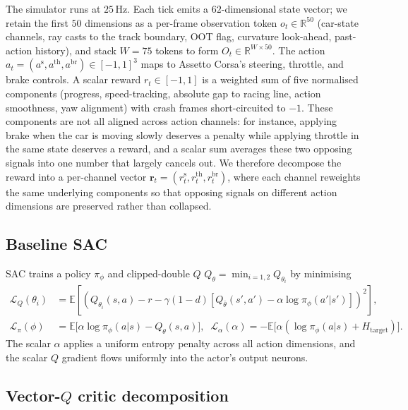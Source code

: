 \documentclass{article}
\begin{document}
The simulator runs at $25$\,Hz. Each tick emits a $62$-dimensional
state vector; we retain the first $50$ dimensions as a per-frame
observation token $o_t \in \mathbb{R}^{50}$ (car-state channels, ray
casts to the track boundary, OOT flag, curvature look-ahead,
past-action history), and stack $W{=}75$ tokens to form
$O_t \in \mathbb{R}^{W\times 50}$. The action
$a_t = (a^\mathrm{s}, a^\mathrm{th}, a^\mathrm{br}) \in [-1, 1]^3$ maps
to Assetto Corsa's steering, throttle, and brake controls. A scalar
reward $r_t \in [-1, 1]$ is a weighted sum of five normalised
components (progress, speed-tracking, absolute gap to racing line,
action smoothness, yaw alignment) with crash frames short-circuited
to $-1$. These components are not all aligned across action
channels: for instance, applying brake when the car is moving
slowly deserves a penalty while applying throttle in the same
state deserves a reward, and a scalar sum averages these two
opposing signals into one number that largely cancels out. We
therefore decompose the reward into a per-channel vector
$\mathbf{r}_t = (r^\mathrm{s}_t, r^\mathrm{th}_t, r^\mathrm{br}_t)$,
where each channel reweights the same underlying components so
that opposing signals on different action dimensions are preserved
rather than collapsed.

\subsection{Baseline SAC}

SAC trains a policy $\pi_\phi$ and clipped-double $Q$
$Q_\theta = \min_{i=1,2} Q_{\theta_i}$ by minimising
\begin{align}
\mathcal{L}_Q(\theta_i) &= \mathbb{E}
\!\left[\left(Q_{\theta_i}(s,a) - r - \gamma(1{-}d)\!\left[Q_{\bar\theta}(s', a') -
  \alpha \log \pi_\phi(a'|s')\right]\right)^2\right],
\label{eq:sac-q}\\
\mathcal{L}_\pi(\phi) &= \mathbb{E}\bigl[\alpha \log \pi_\phi(a|s) - Q_\theta(s, a)\bigr],
\;\;
\mathcal{L}_\alpha(\alpha) = -\mathbb{E}\bigl[\alpha(\log\pi_\phi(a|s) + H_\text{target})\bigr].
\label{eq:sac-pi}
\end{align}
The scalar $\alpha$ applies a uniform entropy penalty across all
action dimensions, and the scalar $Q$ gradient flows uniformly into
the actor's output neurons.

\subsection{Vector-$Q$ critic decomposition}
\label{sec:vector-q}
\end{document}
